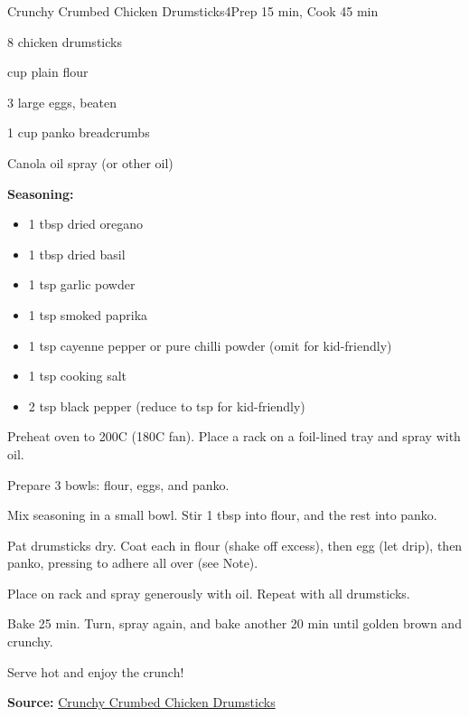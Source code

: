 \begin{recipebox}{Crunchy Crumbed Chicken Drumsticks}{4}{Prep 15 min, Cook 45 min}
\begin{ingredients}
  \item 8 chicken drumsticks
  \item {} cup plain flour
  \item 3 large eggs, beaten
  \item 1 cup panko breadcrumbs
  \item Canola oil spray (or other oil)
  \item \textbf{Seasoning:}
  \begin{itemize}
    \item 1 tbsp dried oregano
    \item 1 tbsp dried basil
    \item 1 tsp garlic powder
    \item 1 tsp smoked paprika
    \item 1 tsp cayenne pepper or pure chilli powder (omit for kid-friendly)
    \item 1 tsp cooking salt
    \item 2 tsp black pepper (reduce to  tsp for kid-friendly)
  \end{itemize}
\end{ingredients}

\begin{method}
  \item Preheat oven to 200\degree C (180\degree C fan). Place a rack on a foil-lined tray and spray with oil.
  \item Prepare 3 bowls: flour, eggs, and panko.
  \item Mix seasoning in a small bowl. Stir 1 tbsp into flour, and the rest into panko.
  \item Pat drumsticks dry. Coat each in flour (shake off excess), then egg (let drip), then panko, pressing to adhere all over (see Note).
  \item Place on rack and spray generously with oil. Repeat with all drumsticks.
  \item Bake 25 min. Turn, spray again, and bake another 20 min until golden brown and crunchy.
  \item Serve hot and enjoy the crunch!
\end{method}

\textbf{Source:} \href{https://www.recipetineats.com/crunchy-crumbed-chicken-drumsticks/}{Crunchy Crumbed Chicken Drumsticks}


\end{recipebox}
